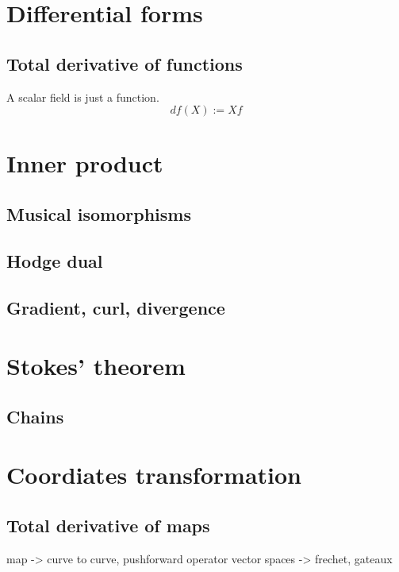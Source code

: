 \documentclass{../exp}
\begin{document}
\section{Differential forms}
\subsection{Total derivative of functions}
A scalar field is just a function.
\[df(X):=Xf\]






















\section{Inner product}
\subsection{Musical isomorphisms}
\subsection{Hodge dual}
\subsection{Gradient, curl, divergence}















\section{Stokes' theorem}
\subsection{Chains}




\section{Coordiates transformation}
\subsection{Total derivative of maps}
map -> curve to curve, pushforward operator
vector spaces -> frechet, gateaux
\end{document}
